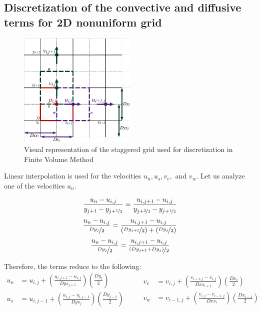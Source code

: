 \documentclass[12pt,a4paper,fleqn]{article}
\begin{document}
\subsection{Discretization of the convective and diffusive terms for 2D nonuniform grid}

\begin{figure}[H]
    \centering
    \includegraphics[width=0.5\textwidth]{staggered_grid.png}
    \caption{Visual representation of the staggered grid used for discretization in Finite Volume Method}
    \label{fig:staggered-grid}
\end{figure}

Linear interpolation is used for the velocities \(u_n, u_s, v_e,\) and \(v_w\). Let us analyze one of the velocities \(u_n\).

\begin{equation*}
\frac{u_n - u_{i,j}}{y_{j+1} - y_{j+\nicefrac{1}{2}}}
= \frac{u_{i,j+1} - u_{i,j}}{y_{j+\nicefrac{3}{2}} - y_{j+\nicefrac{1}{2}}}
\end{equation*}
\begin{equation*}
\frac{u_n - u_{i,j}}{\nicefrac{Dy_j}{2}}
= \frac{u_{i,j+1} - u_{i,j}}
{\left(\nicefrac{Dy_{j+1}}{2}\right) + \left(\nicefrac{Dy_j}{2}\right)}
\end{equation*}
\begin{equation*}
\frac{u_n - u_{i,j}}{\nicefrac{Dy_j}{2}}
= \frac{u_{i,j+1} - u_{i,j}}
{\nicefrac{\left(Dy_{j+1} +Dy_j\right)}{2}}
\end{equation*}

Therefore, the terms reduce to the following:
\begin{equation*}
\begin{aligned}
u_n &= u_{i,j} + \left(\frac{u_{i,j+1} - u_{i,j}}{Dys_{j+1}}\right)
\left(\frac{Dy_j}{2}\right)\\
u_s &= u_{i,j-1} + \left(\frac{u_{i,j} - u_{i,j-1}}{Dys_j}\right)
\left(\frac{Dy_{j-1}}{2}\right)
\end{aligned}
\qquad
\begin{aligned}
v_e &= v_{i,j} + \left(\frac{v_{i+1,j} - v_{i,j}}{Dxs_{i+1}}\right)
\left(\frac{Dx_i}{2}\right)\\
v_w &= v_{i-1,j} + \left(\frac{v_{i,j} - v_{i-1,j}}{Dxs_i}\right)
\left(\frac{Dx_{i-1}}{2}\right)
\end{aligned}
\end{equation*}
\end{document}
